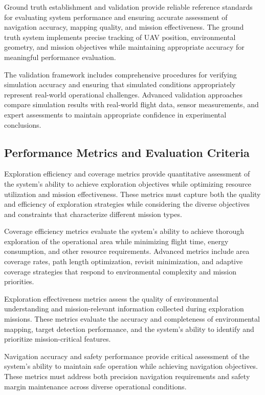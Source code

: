 Ground truth establishment and validation provide reliable reference standards for evaluating system performance and ensuring accurate assessment of navigation accuracy, mapping quality, and mission effectiveness. The ground truth system implements precise tracking of UAV position, environmental geometry, and mission objectives while maintaining appropriate accuracy for meaningful performance evaluation.

The validation framework includes comprehensive procedures for verifying simulation accuracy and ensuring that simulated conditions appropriately represent real-world operational challenges. Advanced validation approaches compare simulation results with real-world flight data, sensor measurements, and expert assessments to maintain appropriate confidence in experimental conclusions.

\subsection{Performance Metrics and Evaluation Criteria}

Exploration efficiency and coverage metrics provide quantitative assessment of the system's ability to achieve exploration objectives while optimizing resource utilization and mission effectiveness. These metrics must capture both the quality and efficiency of exploration strategies while considering the diverse objectives and constraints that characterize different mission types.

Coverage efficiency metrics evaluate the system's ability to achieve thorough exploration of the operational area while minimizing flight time, energy consumption, and other resource requirements. Advanced metrics include area coverage rates, path length optimization, revisit minimization, and adaptive coverage strategies that respond to environmental complexity and mission priorities.

Exploration effectiveness metrics assess the quality of environmental understanding and mission-relevant information collected during exploration missions. These metrics evaluate the accuracy and completeness of environmental mapping, target detection performance, and the system's ability to identify and prioritize mission-critical features.

Navigation accuracy and safety performance provide critical assessment of the system's ability to maintain safe operation while achieving navigation objectives. These metrics must address both precision navigation requirements and safety margin maintenance across diverse operational conditions.

